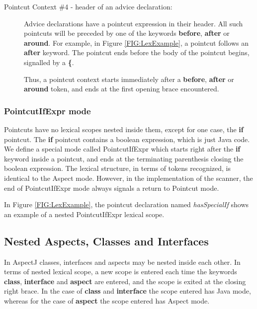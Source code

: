 \begin{description}
\item[Pointcut Context \#4 - header of an advice declaration:]

Advice declarations have a pointcut expression in their header.
All such pointcuts will be preceded by one of the keywords
{\bf before}, {\bf after} or {\bf around}.    For example, in
Figure \ref{FIG:LexExample},  a pointcut follows an {\bf after} keyword.
The pointcut ends before the body of the pointcut begins, signalled by
a {\bf \{}.

Thus, a pointcut context starts immediately after a {\bf before},
{\bf after} or {\bf around} token, and ends at the first opening
brace encountered.

\end{description}

\subsubsection{{\sc PointcutIfExpr} mode} 

Pointcuts have no lexical scopes nested inside them, 
except for one case, the
{\bf if} pointcut.   The {\bf if} pointcut contains a boolean
expression, which is just Java code.
We define a special
mode called {\sc PointcutIfExpr} which starts right after the
{\bf if} keyword inside a pointcut, and ends at the terminating
parenthesis closing the boolean expression.   The lexical structure,
in terms of tokens recognized, is identical to the {\sc Aspect} mode.    
However, in the implementation of the scanner, the end of 
{\sc PointcutIfExpr} mode always signals a return to 
{\sc Pointcut} mode.

In Figure \ref{FIG:LexExample}, the pointcut declaration named
{\em hasSpecialIf} shows an example of a nested {\sc PointcutIfExpr}
lexical scope.

\subsection{Nested Aspects, Classes and Interfaces}

In AspectJ classes, interfaces and aspects may be nested inside each 
other.   In terms of nested lexical scope,  a new scope is entered 
each time the keywords {\bf class}, {\bf interface} and {\bf aspect}
are entered,  and the scope is exited at the closing right brace.
In the case of {\bf class} and {\bf interface} the scope entered
has {\sc Java} mode,  whereas for the case of {\bf aspect} the scope
entered has {\sc Aspect} mode.

